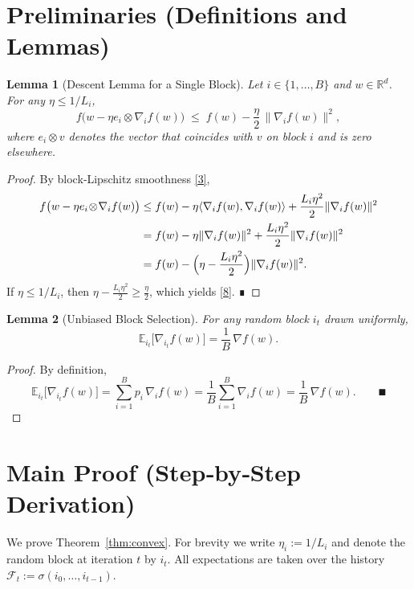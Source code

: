 \documentclass[11pt]{article}
\newtheorem{lemma}{Lemma}[section]
\begin{document}
\section{Preliminaries (Definitions and Lemmas)}
\begin{lemma}[Descent Lemma for a Single Block]\label{lem:descent}
Let $i\in\{1,\dots ,B\}$ and $w\in\mathbb{R}^d$. For any $\eta\le 1/L_i$,
\[
f\bigl(w-\eta e_i\otimes\nabla_i f(w)\bigr)
\;\le\;
f(w)-\frac{\eta}{2}\,\|\nabla_i f(w)\|^{2},
\tag{8}
\]
where $e_i\otimes v$ denotes the vector that coincides with $v$ on block $i$
and is zero elsewhere.
\end{lemma}
\begin{proof}
By block‑Lipschitz smoothness \eqref{3},
\[
\begin{aligned}
f\bigl(w-\eta e_i\!\otimes\!\nabla_i f(w)\bigr)
&\le f(w)-\eta\langle\nabla_i f(w),\nabla_i f(w)\rangle
   +\frac{L_i\eta^{2}}{2}\|\nabla_i f(w)\|^{2}\\
&= f(w)-\eta\|\nabla_i f(w)\|^{2}
   +\frac{L_i\eta^{2}}{2}\|\nabla_i f(w)\|^{2}\\
&= f(w)-\Bigl(\eta-\frac{L_i\eta^{2}}{2}\Bigr)\|\nabla_i f(w)\|^{2}.
\end{aligned}
\]
If $\eta\le 1/L_i$, then $\eta-\frac{L_i\eta^{2}}{2}\ge \frac{\eta}{2}$,
which yields \eqref{8}. ∎
\end{proof}

\begin{lemma}[Unbiased Block Selection]\label{lem:unbiased}
For any random block $i_t$ drawn uniformly,
\[
\mathbb{E}_{i_t}\!\bigl[\nabla_{i_t} f(w)\bigr]
= \frac{1}{B}\,\nabla f(w).
\tag{9}
\]
\end{lemma}
\begin{proof}
By definition,
\[
\mathbb{E}_{i_t}\!\bigl[\nabla_{i_t} f(w)\bigr]
= \sum_{i=1}^{B}p_i\,\nabla_i f(w)
= \frac1B\sum_{i=1}^{B}\nabla_i f(w)
= \frac1B\,\nabla f(w). \qquad∎
\]
\end{proof}

\section{Main Proof (Step‑by‑Step Derivation)}
We prove Theorem~\ref{thm:convex}.  For brevity we write
$\eta_i:=1/L_i$ and denote the random block at iteration $t$ by $i_t$.
All expectations are taken over the history $\mathcal{F}_t:=\sigma(i_0,\dots,i_{t-1})$.
\end{document}
